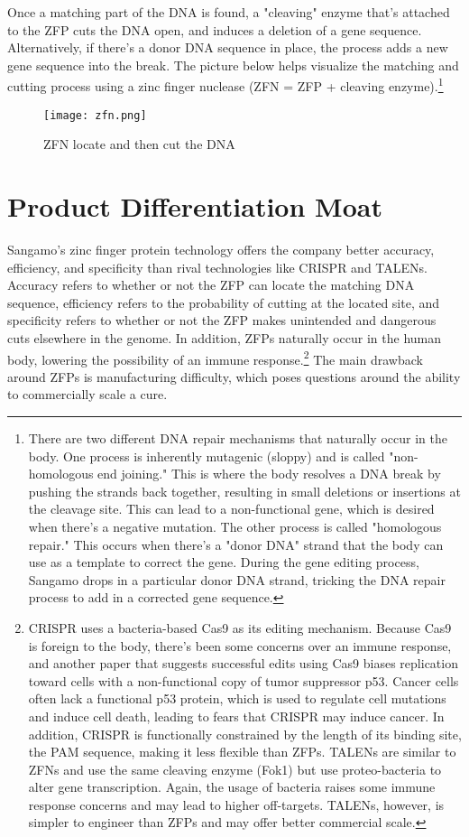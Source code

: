\documentclass{article} %
\begin{document}
Once a matching part of the DNA is found, a "cleaving" enzyme that's attached to the ZFP cuts the DNA open, and induces a deletion of a gene sequence. Alternatively, if there's a donor DNA sequence in place, the process adds a new gene sequence into the break. The picture below helps visualize the matching and cutting process using a zinc finger nuclease (ZFN = ZFP + cleaving enzyme).\footnote{There are two different DNA repair mechanisms that naturally occur in the body. One process is inherently mutagenic (sloppy) and is called "non-homologous end joining." This is where the body resolves a DNA break by pushing the strands back together, resulting in small deletions or insertions at the cleavage site. This can lead to a non-functional gene, which is desired when there's a negative mutation. The other process is called "homologous repair." This occurs when there's a "donor DNA" strand that the body can use as a template to correct the gene. During the gene editing process, Sangamo drops in a particular donor DNA strand, tricking the DNA repair process to add in a corrected gene sequence.} 

\begin{figure}[h]
\texttt{[image: zfn.png]}
\caption{ZFN locate and then cut the DNA}  
\label{fig: industry}
\end{figure} 

\section{Product Differentiation Moat} 
Sangamo's zinc finger protein technology offers the company better accuracy, efficiency, and specificity than rival technologies like CRISPR and TALENs. Accuracy refers to whether or not the ZFP can locate the matching DNA sequence, efficiency refers to the probability of cutting at the located site, and specificity refers to whether or not the ZFP makes unintended and dangerous cuts elsewhere in the genome. In addition, ZFPs naturally occur in the human body, lowering the possibility of an immune response.\footnote{CRISPR uses a bacteria-based Cas9 as its editing mechanism. Because Cas9 is foreign to the body, there's been some concerns over an immune response, and another paper that suggests successful edits using Cas9 biases replication toward cells with a non-functional copy of tumor suppressor p53. Cancer cells often lack a functional p53 protein, which is used to regulate cell mutations and induce cell death, leading to fears that CRISPR may induce cancer. In addition, CRISPR is functionally constrained by the length of its binding site, the PAM sequence, making it less flexible than ZFPs. TALENs are similar to ZFNs and use the same cleaving enzyme (Fok1) but use proteo-bacteria to alter gene transcription. Again, the usage of bacteria raises some immune response concerns and may lead to higher off-targets. TALENs, however, is simpler to engineer than ZFPs and may offer better commercial scale.} The main drawback around ZFPs is manufacturing difficulty, which poses questions around the ability to commercially scale a cure. 
\end{document}
